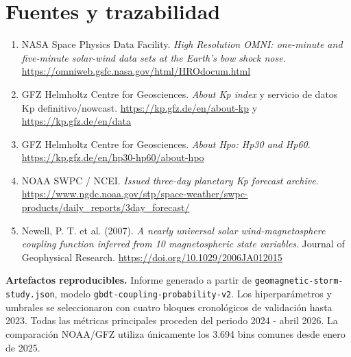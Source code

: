 \documentclass[10pt,a4paper]{article}
\let\plainsection\section
\renewcommand{\section}[1]{\plainsection{\color{Navy}#1}}
\newenvironment{resultbox}{\begin{center}\setlength{\fboxsep}{3mm}\begin{lrbox}{\resultsave}\begin{minipage}{0.91\textwidth}}{\end{minipage}\end{lrbox}\fcolorbox{Line}{white}{\usebox{\resultsave}}\end{center}}
\begin{document}
\section{Fuentes y trazabilidad}

\small
\begin{enumerate}
  \item NASA Space Physics Data Facility. \textit{High Resolution OMNI: one-minute and five-minute solar-wind data sets at the Earth's bow shock nose}. \url{https://omniweb.gsfc.nasa.gov/html/HROdocum.html}
  \item GFZ Helmholtz Centre for Geosciences. \textit{About Kp index} y servicio de datos Kp definitivo/nowcast. \url{https://kp.gfz.de/en/about-kp} y \url{https://kp.gfz.de/en/data}
  \item GFZ Helmholtz Centre for Geosciences. \textit{About Hpo: Hp30 and Hp60}. \url{https://kp.gfz.de/en/hp30-hp60/about-hpo}
  \item NOAA SWPC / NCEI. \textit{Issued three-day planetary Kp forecast archive}. \url{https://www.ngdc.noaa.gov/stp/space-weather/swpc-products/daily_reports/3day_forecast/}
  \item Newell, P. T. et al. (2007). \textit{A nearly universal solar wind-magnetosphere coupling function inferred from 10 magnetospheric state variables}. Journal of Geophysical Research. \url{https://doi.org/10.1029/2006JA012015}
\end{enumerate}

\vfill
\begin{resultbox}
\scriptsize\color{Muted}\textbf{Artefactos reproducibles.} Informe generado a partir de \texttt{geomagnetic-storm-study.json}, modelo \texttt{gbdt-coupling-probability-v2}. Los hiperparámetros y umbrales se seleccionaron con cuatro bloques cronológicos de validación hasta 2023. Todas las métricas principales proceden del periodo 2024 - abril 2026. La comparación NOAA/GFZ utiliza únicamente los 3.694 bins comunes desde enero de 2025.
\end{resultbox}
\end{document}
